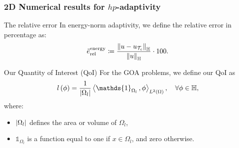 \begin{frame}
  \frametitle{2D Numerical results for \( hp \)-adaptivity}

  \begin{block}{The relative error}
    In energy-norm adaptivity, we define the relative error in percentage as:
    \begin{equation}
	 \tilde{e}_{\textrm{rel}}^{\textrm{energy}} \coloneqq \frac{\left\|u - u_{\mathcal{T}_{c}}\right\|_{\mathbb{H}}}{\left\|u\right\|_{\mathbb{H}}} \cdot 100.
    \end{equation}
  \end{block}
  
  \begin{block}{Our Quantity of Interest (QoI)}
    For the GOA problems, we define our QoI as
    \begin{equation}
      l\left(\phi\right) = 
      \frac{1}{\abs{\Omega_{l}}} \scalaire{\mathds{1}_{\Omega_{l}}}{\phi}_{L^2(\Omega)}, 
      \quad \forall \phi \in \H,
    \end{equation}
    where:
    \begin{itemize}
      \item \( \left|\Omega_{l}\right| \) defines the area or volume of \( \Omega_{l} \),
      \item \( \mathds{1}_{\Omega_{l}} \) is a function equal to one if \( x \in \Omega_{l} \), and zero otherwise.
    \end{itemize}
  \end{block}

\end{frame}

